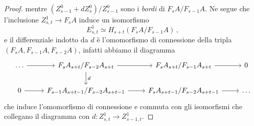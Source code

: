 \begin{thm}
\begin{proof}
		mentre $(Z^{0}_{s-1} + dZ_{s}^{0})/Z^{0}_{s-1}$ sono i \emph{bordi} di $F_{s}A/F_{s-1}A$.
		Ne segue che l'inclusione $Z_{s,t}^{1} \to F_{s}A$ induce un isomorfismo
		\begin{equation*}
			E^{1}_{s,t} \simeq H_{s+t}\left( F_{s}A/F_{s-1}A \right)\,,
		\end{equation*}
		e il differenziale indotto da $d$ è l'omomorfismo di connessione della tripla
		$(F_{s}A, F_{s-1}A, F_{s-2}A)$, infatti abbiamo il diagramma
		\begin{equation*}
			\begin{tikzcd}
				\dots \ar[r] & F_{s}A_{s+t}/F_{s-2}A_{s+t} \ar[r] \ar[d, "d"] 
				& F_{s}A_{s+t}/F_{s-1}A_{s+t} \ar[r] & 0 \\
				0 \ar[r] & F_{s-1}A_{s+t-1}/F_{s-2}A_{s+t-1} \ar[r]
				& F_{s}A_{s+t-1}/F_{s-2}A_{s+t-1} \ar[r] & \dots
			\end{tikzcd}
		\end{equation*}
		che induce l'omomorfismo di connessione e commuta con gli isomorfismi 
		che collegano il diagramma con 
		$d : Z^{1}_{s,t} \to Z^{1}_{s-1,t}$.
		

\end{proof}
\end{thm}
